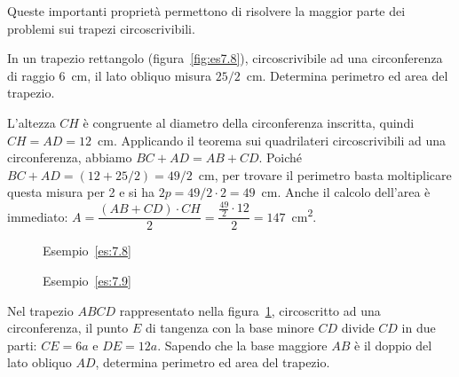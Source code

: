 Queste importanti proprietà permettono di risolvere la maggior parte dei problemi sui trapezi circoscrivibili.

\setlength{\intextsep}{\defintextsep}

\begin{exrig}
\begin{esempio}\label{es:7.8}
In un trapezio rettangolo (figura~\ref{fig:es7.8}), circoscrivibile ad una circonferenza di raggio 6~cm, il lato obliquo misura $25/2$~cm. Determina perimetro ed area del trapezio.\vspace{7pt}

L'altezza $CH$ è congruente al diametro della circonferenza inscritta, quindi $CH = AD = 12$~cm.
Applicando il teorema sui quadrilateri circoscrivibili ad una circonferenza, abbiamo $BC + AD = AB + CD$.
Poiché $BC + AD = (12 + 25/2) = 49/2$~cm, per trovare il perimetro basta moltiplicare questa misura per 2 e si ha $2p=49/2 \cdot 2=49$~cm.
Anche il calcolo dell'area è immediato: $A=\dfrac{(AB+CD)\cdot CH}{2}=\dfrac{\frac{49}{2}\cdot 12}{2}=147$~cm\textsuperscript{2}. 
\end{esempio}

\begin{figure}[!htb]
	\begin{center}
		\begin{minipage}{0.45\textwidth}
			\centering
			
			\caption{Esempio~\ref{es:7.8}}\label{fig:es7.8}
		\end{minipage}
		\hspace{0.03\textwidth}	
		\begin{minipage}{0.45\textwidth}
			\centering
			
			\caption{Esempio~\ref{es:7.9}}\label{fig:es7.9}
		\end{minipage}
	\end{center}
\end{figure}

\begin{esempio}\label{es:7.9}
Nel trapezio $ABCD$ rappresentato nella figura~\ref{fig:es7.9}, circoscritto ad una circonferenza, il punto $E$ di tangenza con la base minore $CD$ divide $CD$ in due parti: $CE = 6a$ e $DE = 12a$. Sapendo che la base maggiore $AB$ è il doppio del lato obliquo $AD$, determina perimetro ed area del trapezio.\vspace{7pt}


\end{esempio}
\end{exrig}
